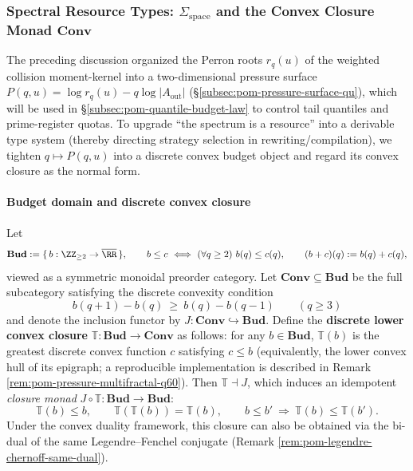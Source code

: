 \subsubsection{Spectral Resource Types: \texorpdfstring{$\Sigma_{\mathrm{space}}$}{Sigma space} and the Convex Closure Monad \texorpdfstring{$\mathbf{Conv}$}{Conv}}\label{subsec:pom-spectral-resource-type}

The preceding discussion organized the Perron roots \(r_q(u)\) of the weighted collision moment-kernel into a two-dimensional pressure surface
\(
P(q,u)=\log r_q(u)-q\log|A_{\mathrm{out}}|
\)
(\S\ref{subsec:pom-pressure-surface-qu}), which will be used in \S\ref{subsec:pom-quantile-budget-law} to control tail quantiles and prime-register quotas.
To upgrade ``the spectrum is a resource'' into a derivable type system (thereby directing strategy selection in rewriting/compilation), we tighten \(q\mapsto P(q,u)\) into a discrete convex budget object and regard its convex closure as the normal form.

\paragraph{Budget domain and discrete convex closure}
Let
\[
\mathbf{Bud}:=\{\,b:\ZZ_{\ge 2}\to\overline{\RR}\,\},
\qquad
b\le c\ \Longleftrightarrow\ (\forall q\ge 2)\ b(q)\le c(q),
\qquad
(b+c)(q):=b(q)+c(q),
\]
viewed as a symmetric monoidal preorder category.
Let \(\mathbf{Conv}\subseteq \mathbf{Bud}\) be the full subcategory satisfying the discrete convexity condition
\[
b(q+1)-b(q)\ \ge\ b(q)-b(q-1)\qquad(q\ge 3)
\]
and denote the inclusion functor by \(J:\mathbf{Conv}\hookrightarrow \mathbf{Bud}\).
Define the \textbf{discrete lower convex closure} \(\mathbb{T}:\mathbf{Bud}\to\mathbf{Conv}\) as follows: for any \(b\in\mathbf{Bud}\), \(\mathbb{T}(b)\) is the greatest discrete convex function \(c\) satisfying \(c\le b\) (equivalently, the lower convex hull of its epigraph; a reproducible implementation is described in Remark \ref{rem:pom-pressure-multifractal-q60}).
Then \(\mathbb{T}\dashv J\), which induces an idempotent \emph{closure monad} \(J\circ\mathbb{T}:\mathbf{Bud}\to\mathbf{Bud}\):
\[
\mathbb{T}(b)\le b,\qquad
\mathbb{T}(\mathbb{T}(b))=\mathbb{T}(b),\qquad
b\le b'\ \Longrightarrow\ \mathbb{T}(b)\le \mathbb{T}(b').
\]
Under the convex duality framework, this closure can also be obtained via the bi-dual of the same Legendre--Fenchel conjugate (Remark \ref{rem:pom-legendre-chernoff-same-dual}).

